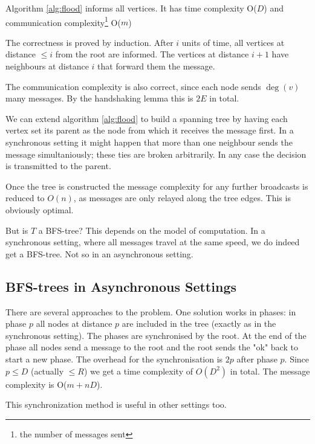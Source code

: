 \begin{thm} Algorithm \ref{alg:flood} informs all vertices. It has time complexity O($D$) and communication complexity\footnote{the number of messages sent} O($m$)
\end{thm}

\begin{pr} The correctness is proved by induction. After $i$ units of time, all vertices at distance $\leq i$ from the root are informed. The vertices at distance $i+1$ have neighbours at distance $i$ that forward them the message.

The communication complexity is also correct, since each node sends $\deg(v)$ many messages. By the handshaking lemma this is $2E$ in total.
\end{pr}

We can extend algorithm \ref{alg:flood} to build a spanning tree by having each vertex set its parent as the node from which it receives the message first. In a synchronous setting it might happen that more than one neighbour sends the message simultaniously; these ties are broken arbitrarily. In any case the decision is transmitted to the parent.

Once the tree is constructed the message complexity for any further broadcasts is reduced to $O(n)$, as messages are only relayed along the tree edges. This is obviously optimal.

But is $T$ a BFS-tree? This depends on the model of computation. In a synchronous setting, where all messages travel at the same speed, we do indeed get a BFS-tree. Not so in an asynchronous setting.

\subsection{BFS-trees in Asynchronous Settings}

There are several approaches to the problem. One solution works in phases: in phase $p$ all nodes at distance $p$ are included in the tree (exactly as in the synchronous setting). The phases are synchronised by the root. At the end of the phase all nodes send a message to the root and the root sends the "ok" back to start a new phase. The overhead for the synchronisation is $2p$ after phase $p$. Since $p\leq D$ (actually $\leq R$) we get a time complexity of $O(D^2)$ in total. The message complexity is O($m+nD$).

This synchronization method is useful in other settings too.
